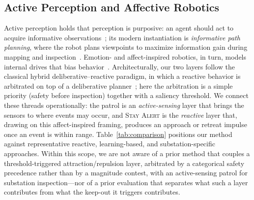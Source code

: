\subsection{Active Perception and Affective Robotics}
Active perception holds that perception is purposive: an agent should act to
acquire informative observations~\cite{bajcsy1988}; its modern instantiation is
\emph{informative path planning}, where the robot plans viewpoints to maximize
information gain during mapping and inspection~\cite{ipp2024nonconvex}. Emotion-
and affect-inspired robotics, in turn, models internal drives that bias
behavior~\cite{breazeal2003}. Architecturally, our two layers follow the
classical hybrid deliberative--reactive paradigm, in which a reactive behavior is
arbitrated on top of a deliberative planner~\cite{hybrid2015delibreact}; here the
arbitration is a simple priority (safety before inspection) together with a
saliency threshold. We
connect these threads operationally: the patrol is an \emph{active-sensing} layer
that brings the sensors to where events may occur, and \textsc{Stay Alert} is the
\emph{reactive} layer that, drawing on this affect-inspired framing, produces an
approach or retreat impulse once an event is within range. Table~\ref{tab:comparison} positions our method against
representative reactive, learning-based, and substation-specific approaches.
Within this scope, we are not aware of a prior method that couples a
threshold-triggered attraction/repulsion layer, arbitrated by a categorical safety
precedence rather than by a magnitude contest, with an active-sensing patrol for
substation inspection---nor of a prior evaluation that separates what such a layer
contributes from what the keep-out it triggers contributes.

